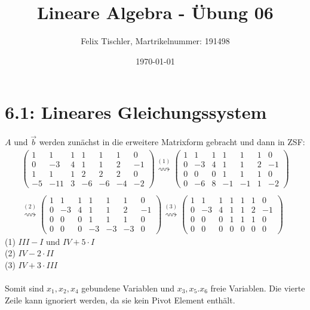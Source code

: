 \documentclass[titlepage]{article}
\begin{document}
	
	\title{Lineare Algebra - Übung 06}
	\author{Felix Tischler, Martrikelnummer: 191498}
	\date{\today}
	\maketitle
	
	\section*{6.1: Lineares Gleichungssystem}
	$A$ und $\vec{b}$ werden zunächst in die erweitere Matrixform gebracht und dann in ZSF:
		\begin{align*}
			\left(\begin{array}{cccccc|c}
				1&1&1&1&1&1&0\\
				0&-3&4&1&1&2&-1\\
				1&1&1&2&2&2&0\\
				-5&-11&3&-6&-6&-4&-2
			\end{array}\right)
			\overset{(1)}{\rightsquigarrow}
			\left(\begin{array}{cccccc|c}
				1&1&1&1&1&1&0\\
				0&-3&4&1&1&2&-1\\
				0&0&0&1&1&1&0\\
				0&-6&8&-1&-1&1&-2
			\end{array}\right)\\\\
			\overset{(2)}{\rightsquigarrow}
			\left(\begin{array}{cccccc|c}
				1&1&1&1&1&1&0\\
				0&-3&4&1&1&2&-1\\
				0&0&0&1&1&1&0\\
				0&0&0&-3&-3&-3&0
			\end{array}\right)
			\overset{(3)}{\rightsquigarrow}
			\left(\begin{array}{cccccc|c}
				1&1&1&1&1&1&0\\
				0&-3&4&1&1&2&-1\\
				0&0&0&1&1&1&0\\
				0&0&0&0&0&0&0
			\end{array}\right)
		\end{align*}
	(1) $III - I \text{ und } IV + 5\cdot I$ \\
	(2) $IV - 2\cdot II$\\
	(3) $IV + 3\cdot III$\\\\
	Somit sind $x_1,x_2,x_4$ gebundene Variablen und $x_3,x_5.x_6$ freie Variablen. Die vierte Zeile kann ignoriert werden, da sie kein Pivot Element enthält.
\end{document}
